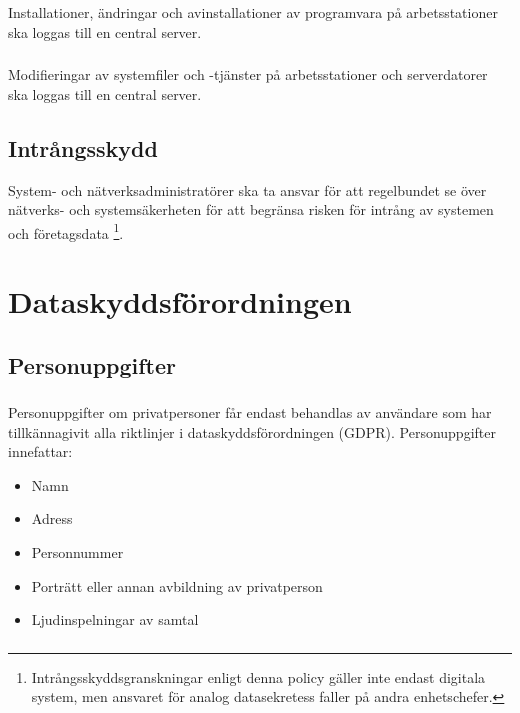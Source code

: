 \documentclass[a4paper,12pt]{article}
\begin{document}
Installationer, ändringar och avinstallationer av programvara på arbetsstationer ska loggas till en central server.

\subsubsection{}

Modifieringar av systemfiler och -tjänster på arbetsstationer och serverdatorer ska loggas till en central server.

\subsection{Intrångsskydd}

System- och nätverksadministratörer ska ta ansvar för att regelbundet se över nätverks- och systemsäkerheten för att begränsa risken för intrång av systemen och företagsdata \footnote{Intrångsskyddsgranskningar enligt denna policy gäller inte endast digitala system, men ansvaret för analog datasekretess faller på andra enhetschefer.}.

\section{Dataskyddsförordningen}

\subsection{Personuppgifter}

\subsubsection{}

Personuppgifter om privatpersoner får endast behandlas av användare som har tillkännagivit alla riktlinjer i dataskyddsförordningen (GDPR). Personuppgifter innefattar:

\begin{itemize}
  \item Namn
  \item Adress
  \item Personnummer
  \item Porträtt eller annan avbildning av privatperson
  \item Ljudinspelningar av samtal
\end{itemize}

\subsubsection{}
\end{document}
